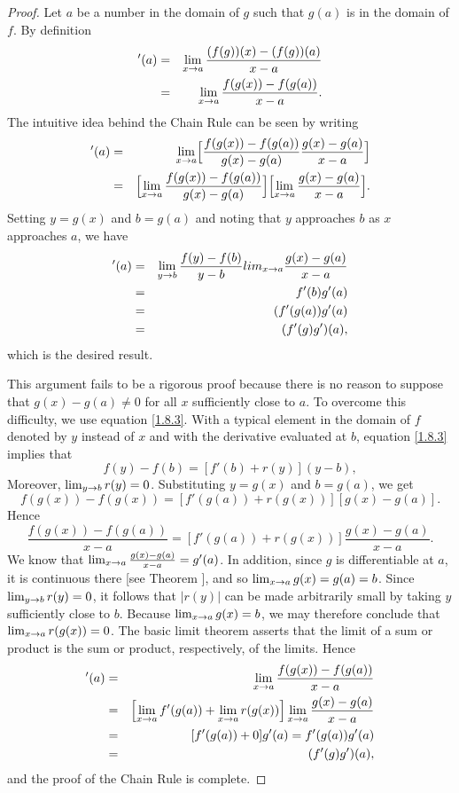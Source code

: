 \begin{proof}
Let $a$ be a number in the domain of $g$ such that $g(a)$
is in the domain of $f$. 
By definition
\begin{eqnarray*}
[ f (g)]'(a)
&=& \lim_{x \goesto a}\frac{(f(g))(x) - (f(g))(a)}{x - a}\\
&=& \lim_{x \goesto a}\frac{f(g(x)) - f(g(a))}{x - a}.
\end{eqnarray*}
The intuitive idea behind the Chain Rule can be seen by writing 
\begin{eqnarray*}
[f(g)]'(a)
&=& \lim_{x \goesto a}
\Bigl[ \frac{f(g(x)) - f(g(a))}{g(x) - g(a)}
\frac{g(x) - g(a)}{x - a} \Bigr] \\
&=& \Bigl[ \lim_{x \goesto a} \frac{f(g(x)) - f(g(a))}{g(x) - g(a)} \Bigr]
\Bigl[ \lim_{x \goesto a}\frac{g(x) - g(a)}{x - a} \Bigr].
\end{eqnarray*}
Setting $y = g(x)$ and $b = g(a)$
and noting that $y$ approaches $b$ as $x$ approaches $a$,
we have
\begin{eqnarray*}
[f(g)]'(a)
&=&
\lim_{y \goesto b}\frac{ f(y) - f(b)}{y - b} 
lim_{x \goesto a} \frac{ g(x) - g(a)}{x - a}\\
&=& f'(b)g'(a)\\
&=& (f'(g(a))g'(a)\\
&=& (f'(g)g')(a),
\end{eqnarray*}
which is the desired result.

This argument fails to be a rigorous proof because there is no reason
to suppose that $g(x) - g(a) \neq 0$ for all $x$ sufficiently close to $a$.
To overcome this difficulty, we use equation \eqref{1.8.3}.
With a typical element in the domain of $f$ denoted by $y$ instead of
$x$ and with the derivative evaluated at $b$, equation \eqref{1.8.3}
implies that
$$
f(y) - f(b) = [f'(b) + r(y)](y - b),
$$
Moreover, $\lim_{y \rightarrow b} r(y) = 0$.
Substituting $y = g(x)$ and $b = g(a)$, we get
$$
f(g(x)) - f(g(x)) = [f'(g(a)) + r(g(x))][g(x) - g(a)].
$$
Hence 
$$
\frac{f (g(x) ) - f (g(a) )}{x - a}
= [f'(g(a)) + r(g(x))] \frac{g(x) - g(a)}{x - a} . 
$$
We know that $\lim_{x \rightarrow a} \frac{g(x) - g(a)}{x - a} = g'(a)$.
In addition, since $g$ is differentiable at $a$, it is continuous there
[see Theorem ],
and so $\lim_{x \rightarrow a} g(x) = g(a) = b$.
Since $\lim_{y \rightarrow b} r(y) = 0$,
it follows that $|r(y)|$ can be made arbitrarily small
by taking $y$ sufficiently close to $b$.
Because $\lim_{x \rightarrow a} g(x) = b$,
we may therefore conclude that $\lim_{x \rightarrow a} r(g(x)) = 0$.
The basic limit theorem 
asserts that the  limit of a sum or product is the sum or product,
respectively, of the limits.
Hence
\begin{eqnarray*}
[f(g)]'(a)
&=& \lim_{x \goesto a}\frac{f(g(x) ) - f(g(a) )}{x - a}\\
&=& \Bigl[\lim_{x \goesto a} f'(g(a) ) 
+ \lim_{x \goesto a} r (g(x) ) \Bigr]
\lim_{x \goesto a}\frac{g(x) - g(a)}{x-a}\\
&=& [f'(g(a)) + 0]g'(a) = f'(g(a))g'(a)\\
&=& (f'(g)g')(a), 
\end{eqnarray*}
and the proof of the Chain Rule is complete.
\end{proof}

